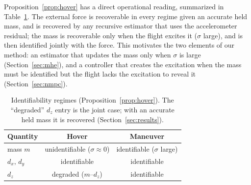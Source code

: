 \documentclass{ieeeaccess}
\def\DIFaddbegin{\color{blue}}\def\DIFaddend{\color{black}}\def\DIFdelbegin{}\def\DIFdelend{} %
\begin{document}
Proposition~\ref{prop:hover} has a direct operational reading, summarized in
Table~\ref{tab:obs}. The external force is recoverable in every regime given an
accurate held mass, and is
recovered by any recursive estimator that uses the accelerometer residual; the
mass is recoverable only when the
flight excites it ($\sigma$ large), and is then identified jointly with the
force. This motivates the two elements of our method: an estimator that updates
the mass only when $\sigma$ is large (Section~\ref{sec:mhe}), and a controller
that creates the excitation when the mass must be identified but the flight
lacks the excitation to reveal it (Section~\ref{sec:nmpc}).

\DIFdelbegin %
\DIFdelend \DIFaddbegin \begin{table}[t]\color{blue}
\centering
\caption{Identifiability regimes (Proposition~\ref{prop:hover}). The ``degraded''
$d_z$ entry is the joint case; with an accurate held mass it is recovered
(Section~\ref{sec:results}).}
\label{tab:obs}
\begin{tabular}{lcc}
\toprule
Quantity & Hover & Maneuver \\
\midrule
mass $m$        & unidentifiable ($\sigma\!\approx\!0$)         & identifiable ($\sigma$ large) \\
$d_x,\,d_y$     & identifiable                                  & identifiable \\
$d_z$           & degraded ($m$--$d_z$)                       & identifiable \\
\bottomrule
\end{tabular}
\end{table}
\DIFaddend 
\end{document}
